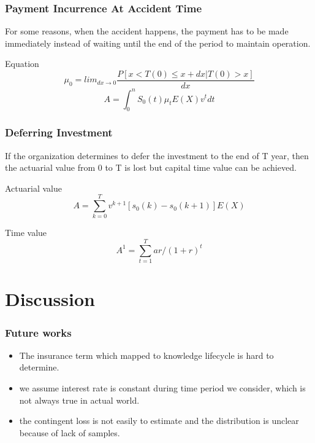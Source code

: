 \documentclass[slidestop,compress,mathserif,table]{beamer}
\begin{document}
\begin{frame}
  \frametitle{Payment Incurrence At Accident Time}
  For some reasons, when the accident happens, the payment has to be made immediately instead of waiting until the end of the period to maintain operation.

  \begin{exampleblock}{Equation}
    \begin{equation}
      \label{eq:1}
      \mu _0=lim_{dx \rightarrow 0} \frac{P[x< T(0) \le x+dx|T(0)>x]}{dx}
    \end{equation}
    \begin{equation}
      \label{eq:2}
      A=\int_0^nS_0(t)\mu_tE(X)v^tdt
    \end{equation}
    
  \end{exampleblock}
\end{frame}

\begin{frame}
  \frametitle{Deferring Investment}
 If the organization determines to defer the investment to the end of T year, then the actuarial value from 0 to T is lost but capital time value can be achieved.
 \begin{exampleblock}{Actuarial value}
     \begin{equation}
    \label{eq:3}
    A=\sum_{k=0}^Tv^{k+1}[s_0(k)-s_0(k+1)]E(X)
  \end{equation}
\end{exampleblock}

\begin{exampleblock}{Time value}
    \begin{equation}
      \label{eq:4}
      A^1=\sum_{t=1}^Tar/(1+r)^t
    \end{equation}
  \end{exampleblock}
\end{frame}

\section{Discussion}

\begin{frame}
  \frametitle{Future works}
  \begin{itemize}
  \item The insurance term which mapped to knowledge  lifecycle is hard to determine.
    \item we assume interest rate is constant during time period we consider, which is not always true in actual world.
      \item the contingent loss is not easily to estimate and the distribution is unclear because of lack of samples.
  \end{itemize}
\end{frame}
\end{document}
